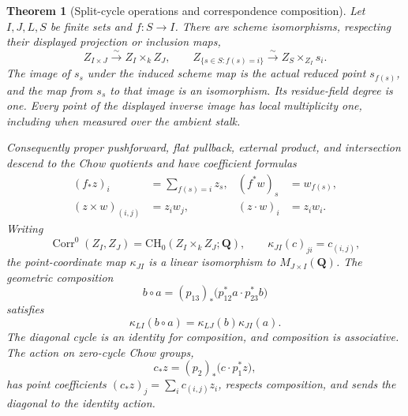 \documentclass[11pt]{article}
\newtheorem{theorem}{Theorem}[section]
\theoremstyle{definition}
\theoremstyle{remark}
\newcommand{\Q}{\mathbf Q}
\begin{document}
\begin{theorem}[Split-cycle operations and correspondence composition]
\label{thm:split-chow-composition}
Let \(I,J,L,S\) be finite sets and \(f:S\to I\).  There are scheme
isomorphisms, respecting their displayed projection or inclusion maps,
\[
 Z_{I\times J}\xrightarrow{\sim}Z_I\times_k Z_J,
 \qquad
 Z_{\{s\in S:f(s)=i\}}\xrightarrow{\sim}
 Z_S\times_{Z_I}s_i.
\]
The image of \(s_s\) under the induced scheme map is the actual reduced
point \(s_{f(s)}\), and the map from \(s_s\) to that image is an
isomorphism.  Its residue-field degree is one.  Every point of the
displayed inverse image has local multiplicity one, including when
measured over the ambient stalk.

Consequently proper pushforward, flat pullback, external product, and
intersection descend to the Chow quotients and have coefficient formulas
\[
 \begin{aligned}
 (f_*z)_i&=\sum_{f(s)=i}z_s,
 & (f^*w)_s&=w_{f(s)},\\
 (z\times w)_{(i,j)}&=z_iw_j,
 & (z\cdot w)_i&=z_iw_i.
 \end{aligned}
\]
Writing
\[
 \operatorname{Corr}^0(Z_I,Z_J)
   =\mathrm{CH}_0(Z_I\times_k Z_J;\Q),
 \qquad \kappa_{JI}(c)_{ji}=c_{(i,j)},
\]
the point-coordinate map \(\kappa_{JI}\) is a linear isomorphism to
\(M_{J\times I}(\Q)\).  The geometric composition
\[
 b\circ a=(p_{13})_*
   \bigl(p_{12}^*a\cdot p_{23}^*b\bigr)
\]
satisfies
\[
 \kappa_{LI}(b\circ a)=\kappa_{LJ}(b)\kappa_{JI}(a).
\]
The diagonal cycle is an identity for composition, and composition is
associative.  The action on zero-cycle Chow groups,
\[
 c_*z=(p_2)_*\bigl(c\cdot p_1^*z\bigr),
\]
has point coefficients \((c_*z)_j=\sum_i c_{(i,j)}z_i\), respects
composition, and sends the diagonal to the identity action.
\end{theorem}
\end{document}

